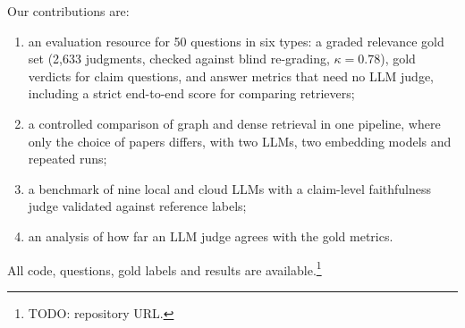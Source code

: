 Our contributions are:
\begin{enumerate}
\item an evaluation resource for 50 questions in six types: a graded
  relevance gold set (2,633 judgments, checked against blind re-grading,
  $\kappa = 0.78$), gold verdicts for claim questions, and answer metrics
  that need no LLM judge, including a strict end-to-end score for comparing
  retrievers;
\item a controlled comparison of graph and dense retrieval in one pipeline,
  where only the choice of papers differs, with two LLMs, two embedding
  models and repeated runs;
\item a benchmark of nine local and cloud LLMs with a claim-level
  faithfulness judge validated against reference labels;
\item an analysis of how far an LLM judge agrees with the gold metrics.
\end{enumerate}
All code, questions, gold labels and results are
available.\footnote{TODO: repository URL.}
